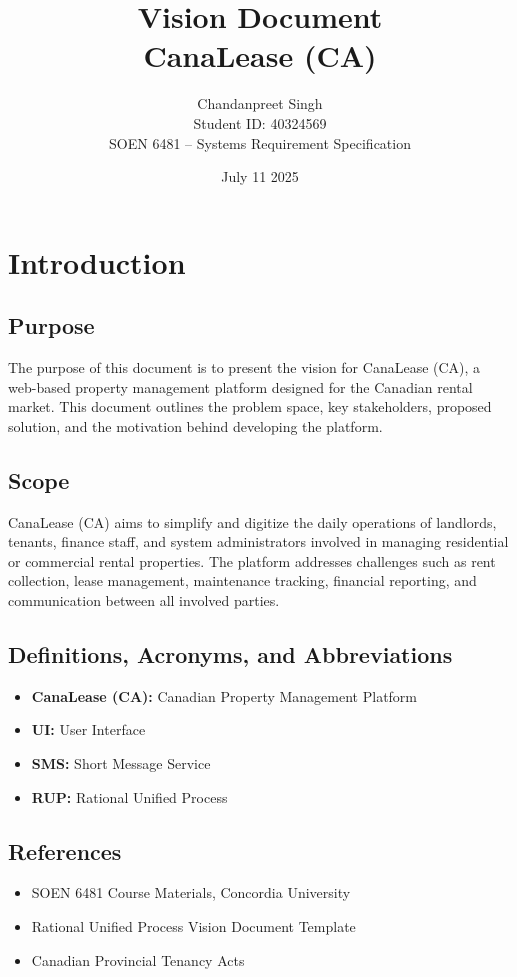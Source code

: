 \documentclass[12pt]{article}
\title{Vision Document\\\large CanaLease (CA)}
\author{Chandanpreet Singh \\ Student ID: 40324569 \\ SOEN 6481 -- Systems Requirement Specification}
\date{July 11 2025 }
\begin{document}
\maketitle
\tableofcontents
\newpage

\section{Introduction}

\subsection{Purpose}
The purpose of this document is to present the vision for CanaLease (CA), a web-based property management platform designed for the Canadian rental market. This document outlines the problem space, key stakeholders, proposed solution, and the motivation behind developing the platform.

\subsection{Scope}
CanaLease (CA) aims to simplify and digitize the daily operations of landlords, tenants, finance staff, and system administrators involved in managing residential or commercial rental properties. The platform addresses challenges such as rent collection, lease management, maintenance tracking, financial reporting, and communication between all involved parties.

\subsection{Definitions, Acronyms, and Abbreviations}
\begin{itemize}
    \item \textbf{CanaLease (CA):} Canadian Property Management Platform
    \item \textbf{UI:} User Interface
    \item \textbf{SMS:} Short Message Service
    \item \textbf{RUP:} Rational Unified Process
\end{itemize}

\subsection{References}
\begin{itemize}
    \item SOEN 6481 Course Materials, Concordia University
    \item Rational Unified Process Vision Document Template
    \item Canadian Provincial Tenancy Acts
\end{itemize}
\end{document}

